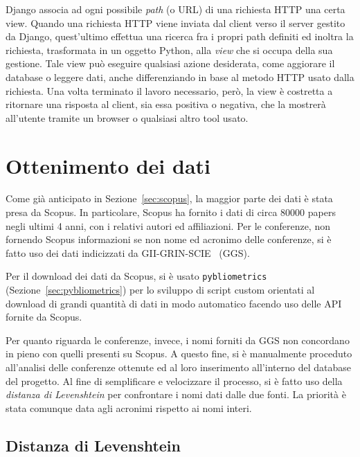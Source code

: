 Django associa ad ogni possibile \textit{path} (o URL) di una richiesta HTTP
una certa view. Quando una richiesta HTTP viene inviata dal client verso il
server gestito da Django, quest'ultimo effettua una ricerca fra i propri path
definiti ed inoltra la richiesta, trasformata in un oggetto Python, alla
\textit{view} che si occupa della sua gestione.
Tale view può eseguire qualsiasi azione desiderata, come aggiorare il database o
leggere dati, anche differenziando in base al metodo HTTP usato dalla richiesta.
Una volta terminato il lavoro necessario, però, la view è costretta a ritornare
una risposta al client, sia essa positiva o negativa, che la mostrerà all'utente
tramite un browser o qualsiasi altro tool usato.

\section{Ottenimento dei dati}

Come già anticipato in Sezione~\ref{sec:scopus}, la maggior parte dei dati è
stata presa da Scopus. In particolare, Scopus ha fornito i dati di circa 80000
papers negli ultimi 4 anni, con i relativi autori ed affiliazioni.
Per le conferenze, non fornendo Scopus informazioni se non nome ed acronimo
delle conferenze, si è fatto uso dei dati indicizzati da GII-GRIN-SCIE~\cite{giigrinscie} (GGS).

Per il download dei dati da Scopus, si è usato \texttt{pybliometrics}
(Sezione~\ref{sec:pybliometrics}) per lo sviluppo di script custom orientati
al download di grandi quantità di dati in modo automatico facendo uso delle
API fornite da Scopus.

Per quanto riguarda le conferenze, invece, i nomi forniti da
GGS non concordano in pieno con quelli presenti su Scopus. A questo fine,
si è manualmente proceduto all'analisi delle conferenze ottenute ed al loro
inserimento all'interno del database del progetto.
Al fine di semplificare e velocizzare il processo, si è fatto uso della
\textit{distanza di Levenshtein} per confrontare i nomi dati dalle due fonti.
La priorità è stata comunque data agli acronimi rispetto ai nomi interi.

\subsection{Distanza di Levenshtein}

